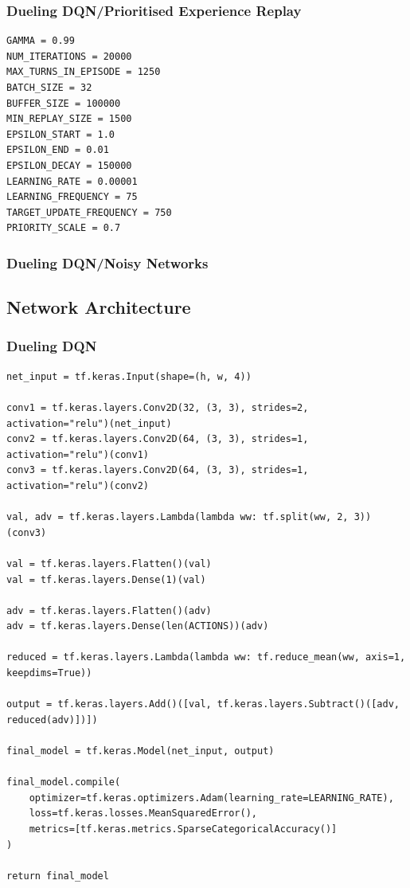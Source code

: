 \documentclass[12pt,a4paper]{article}
\begin{document}
    \subsubsection{Dueling DQN/Prioritised Experience Replay}
    \begin{lstlisting}[label={lst:ddqnperhyperparameters}]
GAMMA = 0.99
NUM_ITERATIONS = 20000
MAX_TURNS_IN_EPISODE = 1250
BATCH_SIZE = 32
BUFFER_SIZE = 100000
MIN_REPLAY_SIZE = 1500
EPSILON_START = 1.0
EPSILON_END = 0.01
EPSILON_DECAY = 150000
LEARNING_RATE = 0.00001
LEARNING_FREQUENCY = 75
TARGET_UPDATE_FREQUENCY = 750
PRIORITY_SCALE = 0.7
    \end{lstlisting}

    \subsubsection{Dueling DQN/Noisy Networks}

    \subsection{Network Architecture}\label{subsec:network-architecture}
    \subsubsection{Dueling DQN}
    \begin{lstlisting}[label={lst:dueling}]
net_input = tf.keras.Input(shape=(h, w, 4))

conv1 = tf.keras.layers.Conv2D(32, (3, 3), strides=2, activation="relu")(net_input)
conv2 = tf.keras.layers.Conv2D(64, (3, 3), strides=1, activation="relu")(conv1)
conv3 = tf.keras.layers.Conv2D(64, (3, 3), strides=1, activation="relu")(conv2)

val, adv = tf.keras.layers.Lambda(lambda ww: tf.split(ww, 2, 3))(conv3)

val = tf.keras.layers.Flatten()(val)
val = tf.keras.layers.Dense(1)(val)

adv = tf.keras.layers.Flatten()(adv)
adv = tf.keras.layers.Dense(len(ACTIONS))(adv)

reduced = tf.keras.layers.Lambda(lambda ww: tf.reduce_mean(ww, axis=1, keepdims=True))

output = tf.keras.layers.Add()([val, tf.keras.layers.Subtract()([adv, reduced(adv)])])

final_model = tf.keras.Model(net_input, output)

final_model.compile(
    optimizer=tf.keras.optimizers.Adam(learning_rate=LEARNING_RATE),
    loss=tf.keras.losses.MeanSquaredError(),
    metrics=[tf.keras.metrics.SparseCategoricalAccuracy()]
)

return final_model
    \end{lstlisting}
\end{document}
